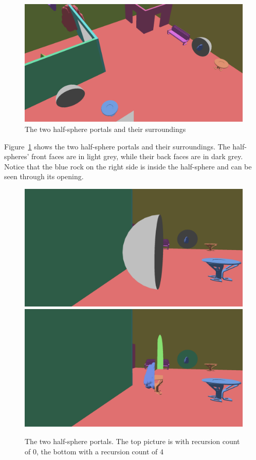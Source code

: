 \begin{figure}[H]
	\includegraphics[width=\linewidth]{images/nonplanarlayout.png}
	\caption{The two half-sphere portals and their surroundings}
	\label{fig:nonplanarlayout}
\end{figure}

Figure~\ref{fig:nonplanarlayout} shows the two half-sphere portals and their surroundings. The half-spheres' front faces are in light grey, while their back faces are in dark grey. Notice that the blue rock on the right side is inside the half-sphere and can be seen through its opening.

\begin{figure}[H]
	\includegraphics[width=\linewidth]{images/NonPlanarR0.png}
	\includegraphics[width=\linewidth]{images/nonplanar.png}
	\caption{The two half-sphere portals. The top picture is with recursion count of 0, the bottom with a recursion count of 4}
	\label{fig:nonplanar}
\end{figure}

